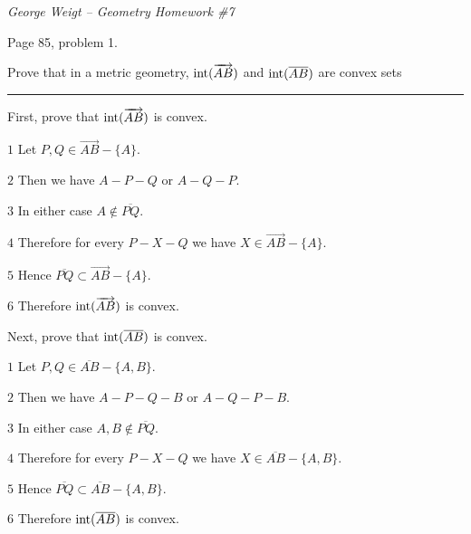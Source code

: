 
\def\INT{\mathop{\rm int}\nolimits}

{\it George Weigt -- Geometry Homework \#7}

\beginsection Page 85, problem 1.

Prove that in a metric geometry, $\INT(\overrightarrow{AB})$ and
$\INT(\overline{AB})$ are convex sets

\medskip
\hrule
\bigskip

\noindent
First, prove that $\INT(\overrightarrow{AB})$ is convex.

\medskip
\item{$\scriptstyle1$}
Let $P,Q\in \overrightarrow{AB}-\{A\}$.

\medskip
\item{$\scriptstyle2$}
Then we have $A{-}P{-}Q$ or $A{-}Q{-}P$.

\medskip
\item{$\scriptstyle3$}
In either case $A\not\in\overline{PQ}$.

\medskip
\item{$\scriptstyle4$}
Therefore for every $P{-}X{-}Q$ we have
$X\in\overrightarrow{AB}-\{A\}$.

\medskip
\item{$\scriptstyle5$}
Hence $\overline{PQ}\subset\overrightarrow{AB}-\{A\}$.

\medskip
\item{$\scriptstyle6$}
Therefore $\INT(\overrightarrow{AB})$ is convex.

\medskip
\noindent
Next, prove that $\INT(\overline{AB})$ is convex.

\medskip
\item{$\scriptstyle1$}
Let $P,Q\in \overline{AB}-\{A,B\}$.

\medskip
\item{$\scriptstyle2$}
Then we have $A{-}P{-}Q{-}B$ or $A{-}Q{-}P{-}B$.

\medskip
\item{$\scriptstyle3$}
In either case $A,B\not\in\overline{PQ}$.

\medskip
\item{$\scriptstyle4$}
Therefore for every $P{-}X{-}Q$ we have
$X\in\overline{AB}-\{A,B\}$.

\medskip
\item{$\scriptstyle5$}
Hence $\overline{PQ}\subset\overline{AB}-\{A,B\}$.

\medskip
\item{$\scriptstyle6$}
Therefore $\INT(\overline{AB})$ is convex.

